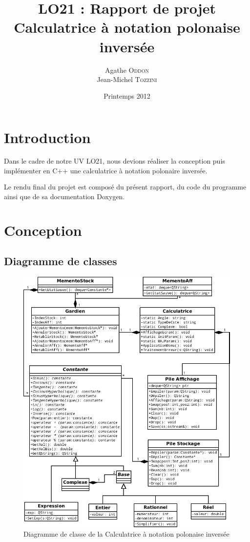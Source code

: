 \documentclass[a4paper,12pt]{article}
\begin{document}
\title{LO21 : Rapport de projet \\ Calculatrice à notation polonaise inversée}
\author{Agathe \textsc{Oddon} \\ Jean-Michel \textsc{Tozzini}}
\date{Printemps 2012}

\maketitle

\section*{Introduction}
Dans le cadre de notre UV LO21, nous devions réaliser la conception puis implémenter en C++ une calculatrice à notation polonaire inversée.

Le rendu final du projet est composé du présent rapport, du code du programme ainsi que de sa documentation Doxygen.

\tableofcontents

\section{Conception}

	\subsection{Diagramme de classes}
		\begin{figure}[H]
			\center
			\includegraphics[width=16cm]{UMLProjetLO21v3.png}
			\caption{Diagramme de classe de la Calculatrice à notation polonaise inversée}
		\end{figure}
		
\end{document}
